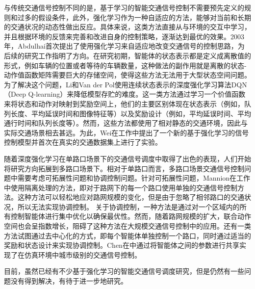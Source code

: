 与传统交通信号控制不同的是，基于学习的智能交通信号控制不需要预先定义的规则和过多的假设条件，此外，强化学习作为一种自适应的方法，能够对当前和长期的交通状况的动态性做出反应。具体来说，这类方法直接从与环境的交互中学习，并且根据环境的反馈来完善和改进自身的控制策略，逐渐达到最优的效果。2003年，Abdulhai\cite{abdulhai2003reinforcement}首次提出了使用强化学习来自适应地改变交通信号的控制思路，为后续的研究工作指明了方向。在研究初期，智能体的状态表示都是定义成离散值的形式\cite{abdoos2013holonic,abdulhai2003reinforcement,bakker2010traffic,el2013multiagent,wiering2000multi}，例如车辆的位置或者等待的车辆数量，这种做法的副作用就是离散的状态-动作值函数矩阵需要巨大的存储空间，使得这些方法无法用于大型状态空间问题。
为了解决这个问题，Li\cite{li2016traffic}和Van der Pol\cite{van2016coordinated}使用连续状态表示的深度强化学习算法DQN（Deep Q-learning）来降低模型存贮的难度。这一类方法通过学习一个价值函数来将状态和动作对映射到奖励空间上，他们的主要区别体现在状态表示（例如，队列长度\cite{mannion2016experimental}、平均延误时间\cite{genders2016using}和图像特征\cite{gao2017adaptive,liu2017cooperative,van2016coordinated}等）以及奖励设计（例如，平均延误时间\cite{arel2010reinforcement,van2016coordinated}、平均通行时间\cite{liu2017cooperative,van2016coordinated}和队列长度\cite{mannion2016experimental}等）。然而，这些方法都使用了相对静态的交通环境，因此与实际交通场景相去甚远。为此，Wei在工作中提出了一个新的基于强化学习的信号控制模型并首次在真实的交通数据集上进行了实验。

随着深度强化学习在单路口场景下的交通信号调度中取得了出色的表现，人们开始将研究方向拓展到多路口场景下。相对于单路口而言，多路口场景交通信号控制问题中需要考虑可拓展性问题和协调控制问题。针对可拓展性问题，Mannion在工作中使用隔离处理的方法，即对于路网下的每一个路口使用单独的交通信号控制方法。这种方法可以轻松地应对路网规模的变化，但是由于忽略了相邻路口的交通状况，所以无法实现协调控制。
关于协调控制，一种方法是通过对一个区域内的所有控制智能体进行集中优化\cite{van2016coordinated}以确保最优性。然而，随着路网规模的扩大，联合动作空间也会呈指数增长，阻碍了这种方法在大规模交通信号控制中的应用。还有一类方法试图通过去中心化的方式，即每个智能体单独控制一个路口，同时通过适当的奖励和状态设计来实现协调控制\cite{nishi2018traffic,wei2019colight}。Chen在中通过将智能体之间的参数进行共享实现了在仿真环境中城市级别的交通信号控制。

目前，虽然已经有不少基于强化学习的智能交通信号调度研究，但是仍然有一些问题没有得到解决，有待于进一步地研究。

